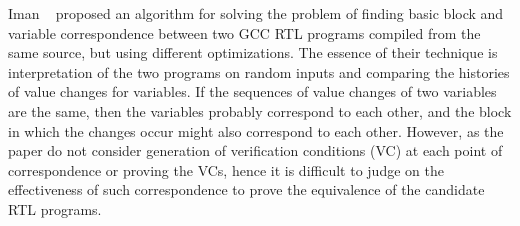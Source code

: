 Iman \etal~\cite{Iman2005} proposed an algorithm for solving the problem of
finding basic block and variable correspondence between two GCC RTL programs
compiled from the same source, but using different optimizations.  The essence
of their technique is interpretation of the two programs on random inputs and
comparing the histories of value changes for variables.  If the sequences of
value changes of two variables are the same, then the variables probably
correspond to each other, and the block in which the changes occur might also
correspond to each other. However, as the paper do not consider  generation of verification conditions (VC) at each point of correspondence   or proving the VCs, hence it is difficult to judge 
on the effectiveness of such correspondence to prove the equivalence of the candidate 
RTL programs.




